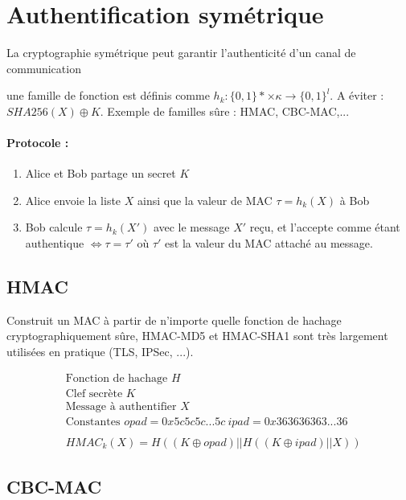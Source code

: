 \documentclass[11pt,a4paper]{report}
\begin{document}
\section{Authentification symétrique}

La cryptographie symétrique peut garantir l’authenticité d’un canal de communication

une famille de fonction est définis comme $h_k:\{0,1\}* \times \kappa \longrightarrow \{0,1\}^l$. A éviter : $SHA256(X) \oplus K$. Exemple de familles sûre : HMAC, CBC-MAC,...

\paragraph*{Protocole : }
\begin{enumerate}
    \item Alice et Bob partage un secret $K$
    \item Alice envoie la liste $X$ ainsi que la valeur de MAC $\tau = h_k(X)$ à Bob
    \item Bob calcule $\tau = h_k(X')$ avec le message $X'$ reçu, et l'accepte comme étant authentique $\Longleftrightarrow \tau = \tau'$ où $\tau'$ est la valeur du MAC attaché au message.
\end{enumerate}

\subsection{HMAC}

Construit un MAC à partir de n’importe quelle fonction de hachage cryptographiquement sûre, HMAC-MD5 et HMAC-SHA1 sont très largement utilisées en pratique (TLS, IPSec, ...).

\begin{align*}
& \text{Fonction de hachage } H \\
& \text{Clef secrète } K \\
& \text{Message à authentifier } X \\
& \text{Constantes } opad = 0x5c5c5c...5c \ ipad = 0x363636363...36 \\
& \\
& HMAC_k(X) = H((K\oplus opad)||H((K\oplus ipad)||X))
\end{align*}

\subsection{CBC-MAC}
\end{document}
